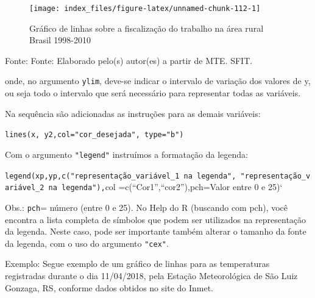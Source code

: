 \documentclass[12pt,brazil,oneside]{book}
\newenvironment{Shaded}{\begin{snugshade}}{\end{snugshade}}
\newcommand{\DataTypeTok}[1]{\textcolor[rgb]{0.13,0.29,0.53}{#1}}
\newcommand{\KeywordTok}[1]{\textcolor[rgb]{0.13,0.29,0.53}{\textbf{#1}}}
\newcommand{\NormalTok}[1]{#1}
\newcommand{\OtherTok}[1]{\textcolor[rgb]{0.56,0.35,0.01}{#1}}
\newcommand{\StringTok}[1]{\textcolor[rgb]{0.31,0.60,0.02}{#1}}
\begin{document}
\begin{figure}[H]

{\centering \texttt{[image: index\_files/figure-latex/unnamed-chunk-112-1]} 

}

\caption{Gráfico de linhas sobre a fiscalização do trabalho na área rural Brasil 1998-2010}\label{fig:unnamed-chunk-112}
\end{figure}

Fonte: Fonte: Elaborado pelo(s) autor(es) a partir de MTE. SFIT.

onde, no argumento \texttt{ylim}, deve-se indicar o intervalo de variação dos valores de y, ou seja todo o intervalo que será necessário para representar todas as variáveis.

Na sequência são adicionadas as instruções para as demais variáveis:

\texttt{lines(x,\ y2,col="cor\_desejada",\ type="b")}

Com o argumento \texttt{"legend"} instruímos a formatação da legenda:

\texttt{legend(xp,yp,c("representação\_variável\_1\ na\ legenda",\ "representação\_variável\_2\ na\ legenda"),}col =c(``Cor1'',``cor2''),pch=Valor entre 0 e 25)`

Obs.: \texttt{pch}= número (entre 0 e 25). No Help do R (buscando com pch), você encontra a lista completa de símbolos que podem ser utilizados na representação da legenda.
Neste caso, pode ser importante também alterar o tamanho da fonte da legenda, com o uso do argumento \texttt{"cex"}.

Exemplo: Segue exemplo de um gráfico de linhas para as temperaturas registradas durante o dia 11/04/2018, pela Estação Meteorológica de São Luiz Gonzaga, RS, conforme dados obtidos no site do Inmet.

\begin{Shaded}
\end{Shaded}
\end{document}
